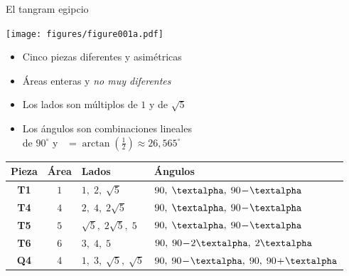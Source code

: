 \documentclass[14pt,aspectratio=169,usenames,dvipsnames]{beamer}
\begin{document}
    \begin{frame}{El tangram egipcio}
        \begin{center}

            \begin{minipage}{15.5ex}\vspace{1ex}
                \texttt{[image: figures/figure001a.pdf]}\\
            \end{minipage}\begin{minipage}{32ex}
                \footnotesize\vspace{-1ex}
                \begin{itemize}
                    \item Cinco piezas diferentes y asimétricas
                    \item Áreas enteras y \emph{no muy diferentes}
                    \item Los lados son múltiplos de $1$ y de $\sqrt{5}$
                    \item Los ángulos son combinaciones lineales\\de $90^\circ$ y \textalpha\ $= \arctan{\!\left(\tfrac{1}{2}\right)} \approx 26,565^\circ$
                \end{itemize}
            \end{minipage}

            \smallskip

            {\footnotesize
            \begin{tabular}{c|c|l|l}
                \;\;\textbf{Pieza}\;\; & \;\;\textbf{Área}\;\; & \;\;\textbf{Lados} & \;\;\textbf{Ángulos} \\ \hline
                \textbf{T1} & $1$ & \;\;$1,\; 2,\; \sqrt{5}$          & \;\;$90,\; \text{\textalpha},\; 90\!-\!\text{\textalpha}$   \\ \hline
                \textbf{T4} & $4$ & \;\;$2,\; 4,\; 2\sqrt{5}$         & \;\;$90,\; \text{\textalpha},\; 90\!-\!\text{\textalpha}$   \\ \hline
                \textbf{T5} & $5$ & \;\;$\sqrt{5},\; 2\sqrt{5},\; 5$  & \;\;$90,\; \text{\textalpha},\; 90\!-\!\text{\textalpha}$   \\ \hline
                \textbf{T6} & $6$ & \;\;$3,\; 4,\; 5$                 & \;\;$90,\; 90\!-\!2\text{\textalpha},\; 2\text{\textalpha}$ \\ \hline
                \textbf{Q4} & $4$ & \;\;$1,\; 3,\; \sqrt{5},\; \sqrt{5}$\;\; & \;\;$90,\; 90\!-\!\text{\textalpha},\; 90,\; 90\!+\!\text{\textalpha}$\;\;
            \end{tabular}}
        \end{center}
    \end{frame}
\end{document}
